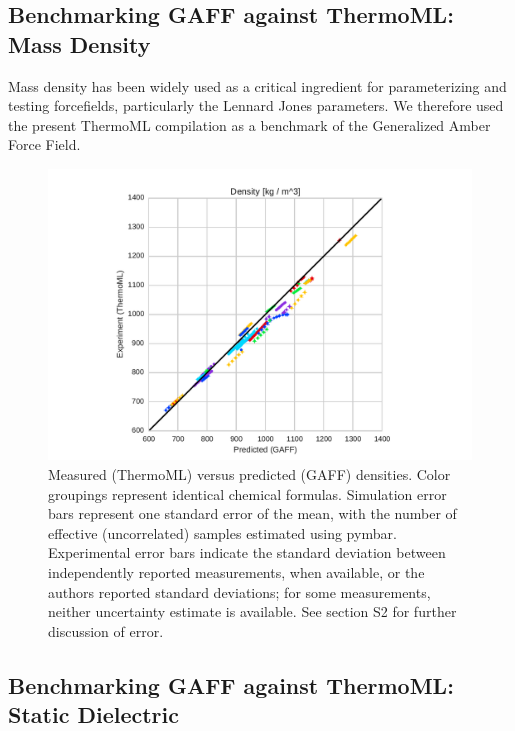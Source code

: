 \documentclass[journal=jacsat,manuscript=article]{achemso}
\begin{document}
\subsection{Benchmarking GAFF against ThermoML: Mass Density}

Mass density has been widely used as a critical ingredient for parameterizing and testing forcefields, particularly the Lennard Jones parameters.  We therefore used the present ThermoML compilation as a benchmark of the Generalized Amber Force Field.  

\begin{figure}
\includegraphics[width=\columnwidth]{./figures/densities_thermoml.pdf}
\caption{Measured (ThermoML) versus predicted (GAFF) densities.  Color groupings represent identical chemical formulas.  Simulation error bars represent one standard error of the mean, with the number of effective (uncorrelated) samples estimated using pymbar.  Experimental error bars indicate the standard deviation between independently reported measurements, when available, or the authors reported standard deviations; for some measurements, neither uncertainty estimate is available.  See section S2 for further discussion of error.
}
\label{figure:Density}
\end{figure}


\subsection{Benchmarking GAFF against ThermoML: Static Dielectric}
\end{document}

